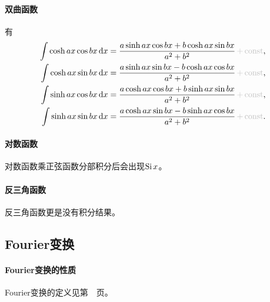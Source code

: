 \paragraph{双曲函数}
有
\begin{align*}
	\int\cosh ax\cos bx\d x=\frac{a\sinh ax\cos bx+b\cosh ax\sin bx}{a^2+b^2}\plusc,\\
	\int\cosh ax\sin bx\d x=\frac{a\sinh ax\sin bx-b\cosh ax\cos bx}{a^2+b^2}\plusc,\\
	\int\sinh ax\cos bx\d x=\frac{a\cosh ax\cos bx+b\sinh ax\sin bx}{a^2+b^2}\plusc,\\
	\int\sinh ax\sin bx\d x=\frac{a\cosh ax\sin bx-b\sinh ax\cos bx}{a^2+b^2}\plusc.
\end{align*}

\paragraph{对数函数}
对数函数乘正弦函数分部积分后会出现$\operatorname{Si} x$。

\paragraph{反三角函数}
反三角函数更是没有积分结果。

\subsection{Fourier变换}

\paragraph{Fourier变换的性质}
\label{The Property of Fourier Transformation}
Fourier变换的定义见第~\pageref{dfn:Integral Transformation}~页。

